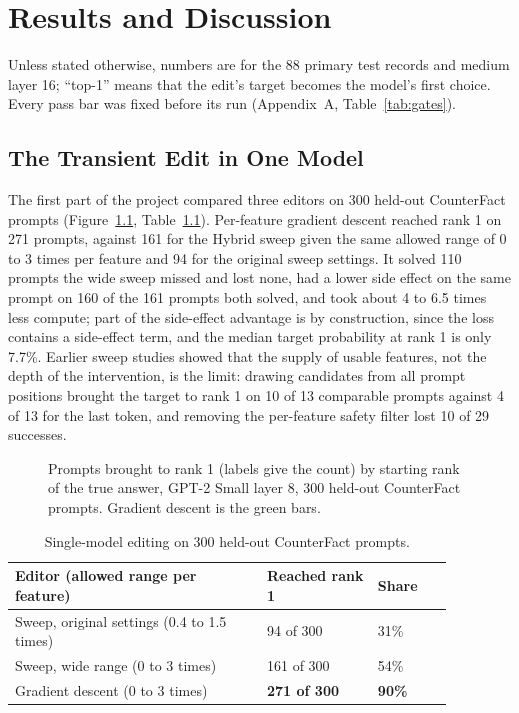 \chapter{Results and Discussion}\label{ch:results}

Unless stated otherwise, numbers are for the 88 primary test records and medium layer 16; ``top-1'' means that the edit's target becomes the model's first choice. Every pass bar was fixed before its run (Appendix~A, Table~\ref{tab:gates}).

\section{The Transient Edit in One Model}\label{sec:single}

The first part of the project compared three editors on 300 held-out CounterFact prompts (Figure~\ref{fig:rank1band}, Table~\ref{tab:single}). Per-feature gradient descent reached rank 1 on 271 prompts, against 161 for the Hybrid sweep given the same allowed range of 0 to 3 times per feature and 94 for the original sweep settings. It solved 110 prompts the wide sweep missed and lost none, had a lower side effect on the same prompt on 160 of the 161 prompts both solved, and took about 4 to 6.5 times less compute; part of the side-effect advantage is by construction, since the loss contains a side-effect term, and the median target probability at rank 1 is only 7.7\%. Earlier sweep studies showed that the supply of usable features, not the depth of the intervention, is the limit: drawing candidates from all prompt positions brought the target to rank 1 on 10 of 13 comparable prompts against 4 of 13 for the last token, and removing the per-feature safety filter lost 10 of 29 successes.

\begin{figure}[t]
\centering
{}
\caption{Prompts brought to rank 1 (labels give the count) by starting rank of the true answer, GPT-2 Small layer 8, 300 held-out CounterFact prompts. Gradient descent is the green bars.}\label{fig:rank1band}
\end{figure}

\begin{table}[t]
\centering\small
\caption{Single-model editing on 300 held-out CounterFact prompts.}\label{tab:single}
\begin{tabular}{|p{0.50\linewidth}|p{0.22\linewidth}|p{0.15\linewidth}|}
\hline
\textbf{Editor (allowed range per feature)} & \textbf{Reached rank 1} & \textbf{Share}\\ \hline
Sweep, original settings (0.4 to 1.5 times) & 94 of 300 & 31\%\\ \hline
Sweep, wide range (0 to 3 times) & 161 of 300 & 54\%\\ \hline
Gradient descent (0 to 3 times) & \textbf{271 of 300} & \textbf{90\%}\\ \hline
\end{tabular}
\end{table}

